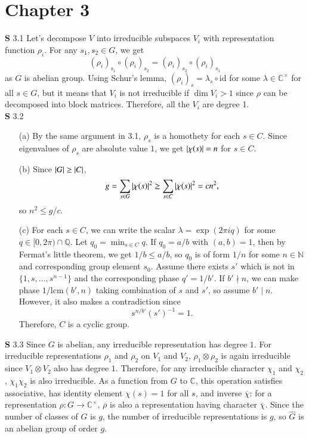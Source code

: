 \documentclass[a4paper, 12pt]{article}
\theoremstyle{Mydefinition}
\theoremstyle{Mytheorem}
\begin{document}
\section{Chapter 3}

\noindent \textbf{S} 3.1
Let's decompose $V$ into irreducible subspaces $V_i$ with representation function $\rho_i$. For any $s_1,s_2\in G$, we get
\begin{equation}
    \left(\rho_i\right)_{s_1}\circ \left(\rho_i\right)_{s_2} = \left(\rho_i\right)_{s_2}\circ \left(\rho_i\right)_{s_1}
\end{equation}
as $G$ is abelian group. Using Schur's lemma, $\left(\rho_i\right)_{s} = \lambda_s\circ \mathrm{id}$ for some $\lambda\in \mathbb{C}^\times$ for all $s\in G$, but it means that $V_i$ is not irreducible if $\dim V_i>1$ since $\rho$ can be decomposed into block matrices. Therefore, all the $V_i$ are degree 1.\\

\noindent \textbf{S} 3.2
\begin{enumerate}
    \item[(a)] By the same argument in 3.1, $\rho_s$ is a homothety for each $s\in C$. Since eigenvalues of $\rho_s$ are absolute value $1$, we get $\abs{\chi(s)} = n$ for $s\in C$.
    \item[(b)] Since $\abs{G}\geq \abs{C}$,
    \begin{equation}
        g = \sum_{s\in G}\abs{\chi(s)}^2\geq \sum_{s\in C}\abs{\chi(s)}^2 = cn^2,
    \end{equation}
    so $n^2\leq g/c$.
    \item[(c)] For each $s\in C$, we can write the scalar $\lambda = \exp(2\pi i q)$ for some $q\in [0,2\pi)\cap \mathbb{Q}$. Let $q_0 = \min_{s\in C}q$. If $q_0=a/b$ with $(a,b)=1$, then by Fermat's little theorem, we get $1/b\leq a/b$, so $q_0$ is of form $1/n$ for some $n\in\mathbb{N}$ and corresponding group element $s_0$. Assume there exists $s'$ which is not in $\{1, s, \ldots, s^{n-1}\}$ and the corresponding phase $q'=1/b'$. If $b'\nmid n$, we can make phase $1/\mathrm{lcm}(b', n)$ taking combination of $s$ and $s'$, so assume $b'\mid n$. However, it also makes a contradiction since
    \begin{equation}
        s^{n/b'}(s')^{-1} = 1.
    \end{equation}
    Therefore, $C$ is a cyclic group.
\end{enumerate}
    
\noindent \textbf{S} 3.3
Since $G$ is abelian, any irreducible representation has degree $1$. For irreducible representations $\rho_1$ and $\rho_2$ on $V_1$ and $V_2$, $\rho_1\otimes \rho_2$ is again irreducible since $V_1\otimes V_2$ also has degree $1$. Therefore, for any irreducible character $\chi_1$ and $\chi_2$, $\chi_1\chi_2$ is also irreducible. As a function from $G$ to $\mathbb{C}$, this operation satisfies associative, has identity element $\chi(s) = 1$ for all $s$, and inverse $\overline{\chi}$: for a representation $\rho:G\rightarrow \mathbb{C}^\times$, $\overline{\rho}$ is also a representation having character $\overline{\chi}$. Since the number of classes of $G$ is $g$, the number of irreducible representations is $g$, so $\hat{G}$ is an abelian group of order $g$.
\end{document}
